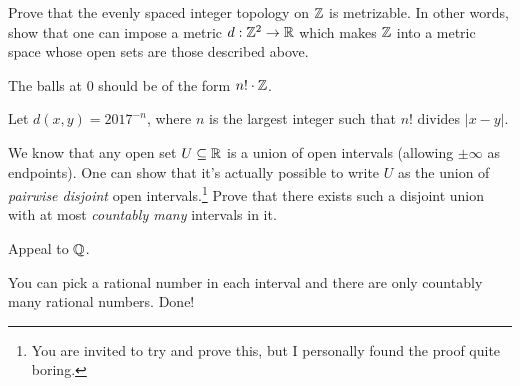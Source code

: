 \begin{problem}
	\gim
	Prove that the evenly spaced integer topology on $\mathbb Z$ is metrizable.
	In other words, show that one can impose a metric $d : \mathbb Z^2 \to \mathbb R$
	which makes $\mathbb Z$ into a metric space whose open sets are those described above.
	\begin{hint}
		The balls at $0$ should be of the form $n! \cdot \mathbb Z$.
	\end{hint}
	\begin{sol}
		Let $d(x,y) = 2017^{-n}$,
		where $n$ is the largest integer
		such that $n!$ divides $\left\lvert x-y \right\rvert$.
	\end{sol}
\end{problem}


\begin{problem}
	\gim
	We know that any open set $U \subseteq \mathbb R$
	is a union of open intervals (allowing $\pm\infty$ as endpoints).
	One can show that it's actually possible to write $U$ as the
	union of \emph{pairwise disjoint} open intervals.\footnote{You are invited to try
	and prove this, but I personally found the proof quite boring.}
	Prove that there exists such a disjoint union with at most \emph{countably many}
	intervals in it.
	\begin{hint}
		Appeal to $\mathbb Q$.
	\end{hint}
	\begin{sol}
		You can pick a rational number in each interval and
		there are only countably many rational numbers. Done!
	\end{sol}
\end{problem}
